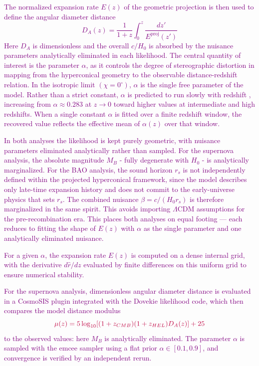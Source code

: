\documentclass[11pt]{article}
\newcommand{\purple}[1]{\textcolor{purple}{#1}}
\begin{document}
\purple{The normalized expansion rate $E(z)$ of the geometric projection is then used to define the angular diameter distance
\begin{equation}
    D_A(z) = \frac{1}{1 + z} \int_{0}^{z} \frac{dz'}{E^{\mathrm{proj}}(z')}
\end{equation}
Here $D_A$ is dimensionless and the overall $c/H_0$ is absorbed by the nuisance parameters analytically eliminated in each likelihood. The central quantity of interest is the parameter $\alpha$, as it controls the degree of stereographic distortion in mapping from the hyperconical geometry to the observable distance-redshift relation. In the isotropic limit $(\chi = 0^\circ)$, $\alpha$ is the single free parameter of the model. Rather than a strict constant, $\alpha$ is predicted to run slowly with redshift \cite{monjo2018projected}, increasing from $\alpha \approx 0.283$ at $z \rightarrow 0$ toward higher values at intermediate and high redshifts. When a single constant $\alpha$ is fitted over a finite redshift window, the recovered value reflects the effective mean of $\alpha(z)$ over that window.}

\purple{In both analyses the likelihood is kept purely geometric, with nuisance parameters eliminated analytically rather than sampled. For the supernova analysis, the absolute magnitude $M_B$ - fully degenerate with $H_0$ - is analytically marginalized. For the BAO analysis, the sound horizon $r_s$ is not independently defined within the projected hyperconical framework, since the model describes only late-time expansion history and does not commit to the early-universe physics that sets $r_s$. The combined nuisance $\beta = c/(H_0r_s)$ is therefore marginalized in the same spirit. This avoids importing $\Lambda$CDM assumptions for the pre-recombination era. This places both analyses on equal footing --- each reduces to fitting the shape of $E(z)$ with $\alpha$ as the single parameter and one analytically eliminated nuisance.}

\purple{For a given $\alpha$, the expansion rate $E(z)$ is computed on a dense internal grid, with the derivative $d\hat{r}/dz$ evaluated by finite differences on this uniform grid to ensure numerical stability.}

\purple{For the supernova analysis, dimensionless angular diameter distance is evaluated in a CosmoSIS plugin integrated with the Dovekie likelihood code, which then compares the model distance modulus}
\begin{equation}
    \purple{\mu(z) = 5\log_{10}[(1 + z_{CMB})(1 + z_{HEL})D_A(z)] + 25}
\end{equation}
\purple{to the observed values: here $M_B$ is analytically eliminated. The parameter $\alpha$ is sampled with the emcee sampler using a flat prior $\alpha \in [0.1,0.9]$, and convergence is verified by an independent rerun.}
\end{document}
